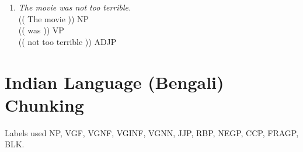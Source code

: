 \documentclass[11pt,a4paper,twocolumn]{article}
\begin{document}
\begin{enumerate}
	\item \textit{The movie was not too terrible.}\\
	$ $\\
	\textcolor{diff}{(( The movie ))} NP\\
	\textcolor{diff}{(( was ))} VP\\
	\textcolor{diff}{(( not too terrible ))} ADJP\\
	
	
	\end{enumerate}		
	
	\section{Indian Language (Bengali) Chunking}
	
	Labels used NP, VGF, VGNF, VGINF, VGNN, JJP, RBP, NEGP, CCP, FRAGP, BLK.\\
\end{document}
